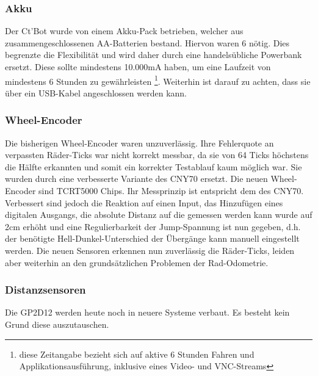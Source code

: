 \documentclass[twoside,11pt, a4paper]{report}
\begin{document}
	\subsubsection{Akku}
	Der Ct'Bot wurde von einem Akku-Pack betrieben, welcher aus zusammengeschlossenen AA-Batterien bestand. Hiervon waren 6 nötig. Dies begrenzte die Flexibilität und wird daher durch eine handelsübliche Powerbank ersetzt. Diese sollte mindestens 10.000mA haben, um eine Laufzeit von mindestens 6 Stunden zu gewährleisten \footnote{diese Zeitangabe bezieht sich auf aktive 6 Stunden Fahren und Applikationsausführung, inklusive eines Video- und VNC-Streams}. Weiterhin ist darauf zu achten, dass sie über ein USB-Kabel angeschlossen werden kann. 
	
	\subsubsection{Wheel-Encoder}
	Die bisherigen Wheel-Encoder waren unzuverlässig. Ihre Fehlerquote an verpassten Räder-Ticks war nicht korrekt messbar, da sie von 64 Ticks höchstens die Hälfte erkannten und somit ein korrekter Testablauf kaum möglich war. Sie wurden durch eine verbesserte Variante des CNY70 ersetzt. Die neuen Wheel-Encoder sind TCRT5000 Chips. Ihr Messprinzip ist entspricht dem des CNY70. Verbessert sind jedoch die Reaktion auf einen Input, das Hinzufügen eines digitalen Ausgangs, die absolute Distanz auf die gemessen werden kann wurde auf 2cm erhöht und eine Regulierbarkeit der Jump-Spannung ist nun gegeben, d.h. der benötigte Hell-Dunkel-Unterschied der Übergänge kann manuell eingestellt werden. Die neuen Sensoren erkennen nun zuverlässig die Räder-Ticks, leiden aber weiterhin an den grundsätzlichen Problemen der Rad-Odometrie. 
	
	\subsubsection{Distanzsensoren}
	Die GP2D12 werden heute noch in neuere Systeme verbaut. Es besteht kein Grund diese auszutauschen. \\
	
\end{document}
